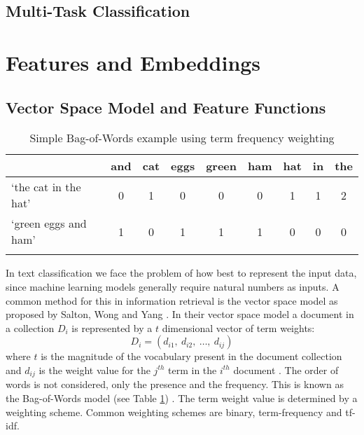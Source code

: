 \documentclass[Dissertation.tex]{subfiles}
\begin{document}
\subsection{Multi-Task Classification}
\section{Features and Embeddings}
\subsection{Vector Space Model and Feature Functions}\label{sec:vecSpace}


\begin{table}[]
	\caption{Simple Bag-of-Words example using term frequency weighting}
	\label{bagOfWords}
	\centering
	\begin{tabular}{@{}lllllllll@{}}
		\toprule
		& and                    & cat                    & eggs                   & green                  & ham                    & hat                    & in                     & the                    \\ \midrule  \cline{2-9} 
		\multicolumn{1}{l|}{`the cat in the hat'} & \multicolumn{1}{c|}{0} & \multicolumn{1}{c|}{1} & \multicolumn{1}{c|}{0} & \multicolumn{1}{c|}{0} & \multicolumn{1}{c|}{0} & \multicolumn{1}{c|}{1} & \multicolumn{1}{c|}{1} & \multicolumn{1}{c|}{2} \\ \cline{2-9} 
		\multicolumn{1}{l|}{`green eggs and ham'} & \multicolumn{1}{c|}{1} & \multicolumn{1}{c|}{0} & \multicolumn{1}{c|}{1} & \multicolumn{1}{c|}{1} & \multicolumn{1}{c|}{1} & \multicolumn{1}{c|}{0} & \multicolumn{1}{c|}{0} & \multicolumn{1}{c|}{0} \\  \cline{2-9} 
		&                        &                        &                        &                        &                        &                        &                        &                        \\ \bottomrule
	\end{tabular}
	
\end{table}

In text classification we face the problem of how best to represent the input data, since machine learning models generally require natural numbers as inputs. A common method for this in information retrieval is the vector space model as proposed by Salton, Wong and Yang \cite{saltonVectorSpaceModel1975}. In their vector space model a document in a collection $ D_i $ is represented by a $ t $ dimensional vector of term weights: $$ D_i = (d_{i1},\ d_{i2},\ \dots,\ d_{ij})  $$ where $ t $ is the magnitude of the vocabulary present in the document collection and $ d_{ij} $ is the weight value for the $ j^{th} $ term in the $ i^{th} $ document \cite{saltonVectorSpaceModel1975}.
The order of words is not considered, only the presence and the frequency. This is known as the Bag-of-Words model (see Table \ref{bagOfWords}) \cite{jurafskySpeechLanguageProcessing}. The term weight value is determined by a weighting scheme. Common weighting schemes are binary, term-frequency and tf-idf.
\end{document}
